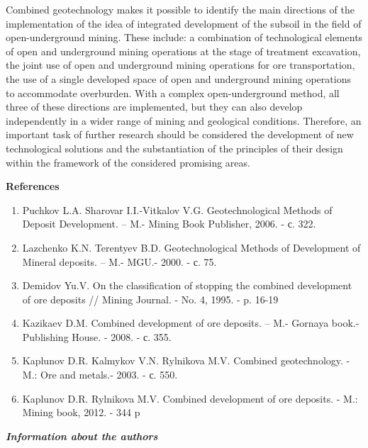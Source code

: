 \begin{multicols}{2}
Combined geotechnology makes it possible to identify the main directions
of the implementation of the idea of integrated development of the
subsoil in the field of open-underground mining. These include: a
combination of technological elements of open and underground mining
operations at the stage of treatment excavation, the joint use of open
and underground mining operations for ore transportation, the use of a
single developed space of open and underground mining operations to
accommodate overburden. With a complex open-underground method, all
three of these directions are implemented, but they can also develop
independently in a wider range of mining and geological conditions.
Therefore, an important task of further research should be considered
the development of new technological solutions and the substantiation of
the principles of their design within the framework of the considered
promising areas.
\end{multicols}

\begin{center}
{\bfseries References}
\end{center}

\begin{enumerate}
\item
Puchkov L.A. Sharovar I.I.-Vitkalov V.G. Geotechnological Methods of Deposit
Development. – M.- Mining Book Publisher, 2006. - с. 322.

\item
Lazchenko K.N. Terentyev B.D. Geotechnological Methods of Development of Mineral
deposits. – M.- MGU.- 2000. - с. 75.

\item
Demidov Yu.V. On the classification of stopping the combined development of ore deposits //
Mining Journal. - No. 4, 1995. - p. 16-19

\item
Kazikaev D.M. Combined development of ore deposits. – M.- Gornaya book.- Publishing
House. - 2008. - с. 355.

\item
Kaplunov D.R. Kalmykov V.N. Rylnikova M.V. Combined geotechnology. - M.: Ore and
metals.- 2003. - с. 550.

\item
Kaplunov D.R. Rylnikova M.V. Combined development of ore deposits. - M.: Mining book,
2012. - 344 p
\end{enumerate}

\begin{center}
\emph{{\bfseries Information about the authors}}
\end{center}

